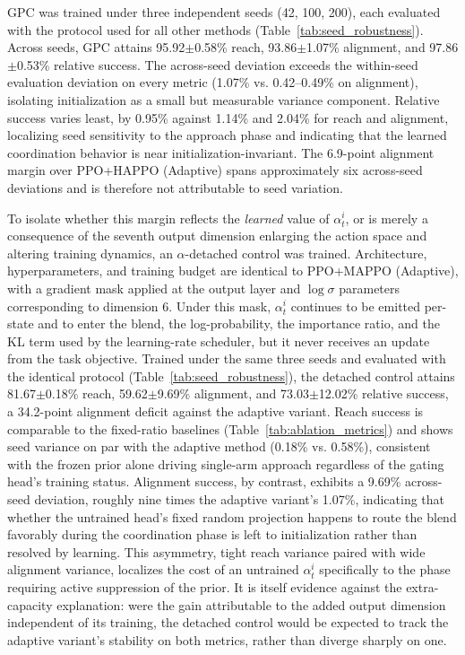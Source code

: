 \documentclass[a4paper,fleqn]{cas-dc}
\begin{document}
GPC was trained under three independent seeds (42, 100, 200), each evaluated with the protocol used for all other methods (Table~\ref{tab:seed_robustness}). Across seeds, GPC attains 95.92$\pm$0.58\% reach, 93.86$\pm$1.07\% alignment, and 97.86$\pm$0.53\% relative success. The across-seed deviation exceeds the within-seed evaluation deviation on every metric (1.07\% vs. 0.42--0.49\% on alignment), isolating initialization as a small but measurable variance component. Relative success varies least, by 0.95\% against 1.14\% and 2.04\% for reach and alignment, localizing seed sensitivity to the approach phase and indicating that the learned coordination behavior is near initialization-invariant. The 6.9-point alignment margin over PPO+HAPPO (Adaptive) spans approximately six across-seed deviations and is therefore not attributable to seed variation.

To isolate whether this margin reflects the \emph{learned} value of $\alpha^{i}_{t}$, or is merely a consequence of the seventh output dimension enlarging the action space and altering training dynamics, an $\alpha$-detached control was trained. Architecture, hyperparameters, and training budget are identical to PPO+MAPPO (Adaptive), with a gradient mask applied at the output layer and $\log\sigma$ parameters corresponding to dimension 6. Under this mask, $\alpha^{i}_{t}$ continues to be emitted per-state and to enter the blend, the log-probability, the importance ratio, and the KL term used by the learning-rate scheduler, but it never receives an update from the task objective. Trained under the same three seeds and evaluated with the identical protocol (Table~\ref{tab:seed_robustness}), the detached control attains 81.67$\pm$0.18\% reach, 59.62$\pm$9.69\% alignment, and 73.03$\pm$12.02\% relative success, a 34.2-point alignment deficit against the adaptive variant. Reach success is comparable to the fixed-ratio baselines (Table~\ref{tab:ablation_metrics}) and shows seed variance on par with the adaptive method (0.18\% vs. 0.58\%), consistent with the frozen prior alone driving single-arm approach regardless of the gating head's training status. Alignment success, by contrast, exhibits a 9.69\% across-seed deviation, roughly nine times the adaptive variant's 1.07\%, indicating that whether the untrained head's fixed random projection happens to route the blend favorably during the coordination phase is left to initialization rather than resolved by learning. This asymmetry, tight reach variance paired with wide alignment variance, localizes the cost of an untrained $\alpha^{i}_{t}$ specifically to the phase requiring active suppression of the prior. It is itself evidence against the extra-capacity explanation: were the gain attributable to the added output dimension independent of its training, the detached control would be expected to track the adaptive variant's stability on both metrics, rather than diverge sharply on one.
\end{document}

